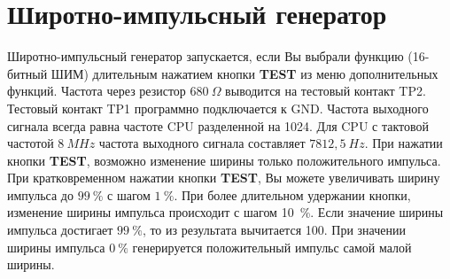 \section{Широтно-импульсный генератор}
Широтно-импульсный генератор запускается, если Вы выбрали функцию  (16-битный ШИМ)
длительным нажатием кнопки \textbf{ TEST} из меню дополнительных функций.
Частота через резистор \(680~\Omega\) выводится на тестовый контакт TP2.
Тестовый контакт TP1 программно подключается к GND.
Частота выходного сигнала всегда равна частоте CPU разделенной на 1024.
Для CPU с тактовой частотой \(8~MHz\) частота выходного сигнала составляет \(7812,5~Hz\).
При нажатии кнопки \textbf{ TEST}, возможно изменение ширины только положительного импульса.
При кратковременном нажатии кнопки \textbf{ TEST}, Вы можете увеличивать ширину импульса до 
\(99~\%\) с шагом \(1~\%\). При более длительном удержании кнопки, изменение ширины 
импульса происходит с шагом 10~\%.   
Если значение ширины импульса достигает \(99~\%\), то из результата вычитается 100.
При значении ширины импульса \(0~\%\) генерируется положительный импульс самой малой ширины.
